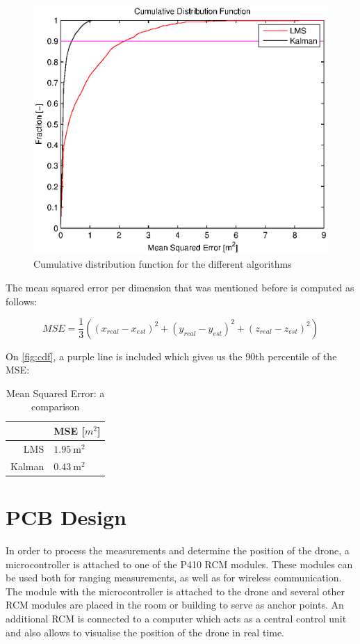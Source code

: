 \documentclass[a4paper]{article}        %
\begin{document}
			\begin{figure}[H]
				\centering
				\includegraphics[width=\textwidth]{images/cdf_algorithms.eps}
				\caption{Cumulative distribution function for the different algorithms}
				\label{fig:cdf}
			\end{figure}

The mean squared error per dimension that was mentioned before is computed as follows:

\begin{equation}
MSE = \dfrac{1}{3}((x_{real}-x_{est})^2+(y_{real}-y_{est})^2+(z_{real}-z_{est})^2)
\end{equation}

On \autoref{fig:cdf}, a purple line is included which gives us the 90th percentile of the MSE:

\begin{table}[H]
\begin{center}
\begin{tabular}{ | r | l | }
    \hline
     & MSE [$m^2$] \\ \hline
    LMS & $\SI{1.95}{\square\meter}$ \\ \hline
    Kalman & $\SI{0.43}{\square\meter}$ \\
    \hline
\end{tabular}
\end{center}
\caption{Mean Squared Error: a comparison}
\label{table:MSE}
\end{table}

\section{PCB Design}
  In order to process the measurements and determine the position of the drone, a microcontroller is attached to one of the P410 RCM modules.
  These modules can be used both for ranging measurements, as well as for wireless communication. The module with the microcontroller is attached to the drone and several other RCM modules are placed in the room or building to serve as anchor points. An additional RCM is connected to a computer which acts as a central control unit and also allows to visualise the position of the drone in real time.
\end{document}
